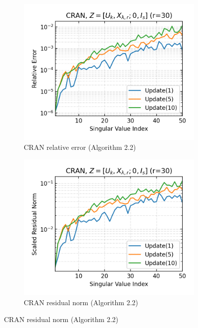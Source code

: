 \begin{figure}\ContinuedFloat
  \begin{subfigure}[b]{0.48\textwidth}
    \centering
    \includegraphics[width=\textwidth]{figures/cran/CRAN_bcg_n_batches_10_k_dims_50_rval_30_rel_err.png}
    \caption{CRAN relative error (Algorithm 2.2)}
  \end{subfigure}
  \hfill
  \begin{subfigure}[b]{0.48\textwidth}
    \centering
    \includegraphics[width=\textwidth]{figures/cran/CRAN_bcg_n_batches_10_k_dims_50_rval_30_res_norm.png}
    \caption{CRAN residual norm (Algorithm 2.2)}

\end{subfigure}
\end{figure}

